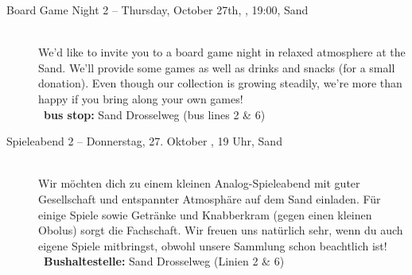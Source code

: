 \begin{description}


\ifml
	\item[Board Game Night 2 -- Thursday, October 27th, \YEAR, 19:00, Sand]~\\
	We'd like to invite you to a board game night in relaxed atmosphere at the Sand.
	We'll provide some games as well as drinks and snacks (for a small donation).
	Even though our collection is growing steadily, we're more than happy if you bring along your own games!\\
	~\textbf{bus stop:} Sand Drosselweg (bus lines 2 \& 6)
\else
    \item[Spieleabend 2 -- Donnerstag, 27. Oktober \YEAR, 19 Uhr, Sand]~\\
	Wir möchten dich zu einem kleinen Analog-Spieleabend mit guter Gesellschaft und entspannter Atmosphäre auf dem Sand einladen.
	Für einige Spiele sowie Getränke und Knabberkram (gegen einen kleinen Obolus) sorgt die Fachschaft.
	Wir freuen uns natürlich sehr, wenn du auch eigene Spiele mitbringst, obwohl unsere Sammlung schon beachtlich ist!\\
	~\textbf{Bushaltestelle:} Sand Drosselweg (Linien 2 \& 6)
\fi


\ifkogwiss
\fi




\end{description}
